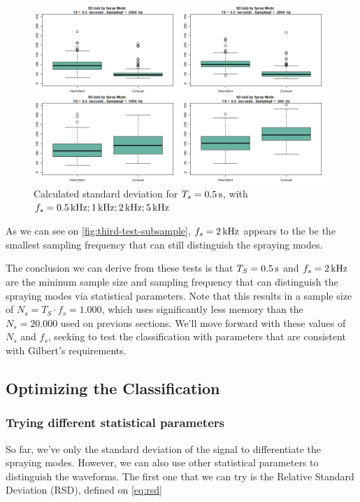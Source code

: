 \documentclass[oneside,12pt]{article}
\begin{document}
\begin{figure}[h!]
    \centering
    \includegraphics[width=1\textwidth,trim=1 1 1 1,clip]{figures/third-test-subsample.png}
    \caption{Calculated standard deviation for $T_s = 0.5 \,\mathrm{s}$, with $f_s = 0.5 \,\mathrm{kHz}; 1 \,\mathrm{kHz}; 2 \,\mathrm{kHz}; 5 \,\mathrm{kHz}$}
    \label{fig:third-test-subsample}
\end{figure}

As we can see on \autoref{fig:third-test-subsample}, $f_s = 2 \,\mathrm{kHz}$ appears to the be the smallest sampling frequency that can still distinguish the spraying  
modes. 

The conclusion we can derive from these tests is that $T_S = 0.5 \,\mathrm{s}$ and $f_s = 2 \,\mathrm{kHz}$ are the mininum sample size and sampling frequency that
can distinguish the spraying modes via statistical parameters. Note that this results in a sample size of $N_s = T_S \cdot f_s = 1.000$, which uses 
significantly less memory than the $N_s = 20.000$ used on previous sections. We'll move forward with these values of $N_s$ and $f_s$, seeking to test the classification
with parameters that are consistent with Gilbert's requirements.

\subsection{Optimizing the Classification}

\subsubsection{Trying different statistical parameters}

So far, we've only the standard deviation of the signal to differentiate the spraying modes. However, we can also use other statistical parameters 
to distinguish the waveforms. The first one that we can try is the Relative Standard Deviation (RSD), defined on \autoref{eq:rsd}
\end{document}
